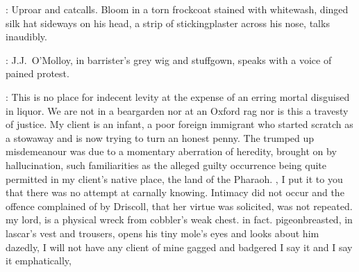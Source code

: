 :
Uproar and catcalls.
Bloom in a torn frockcoat stained with whitewash,
dinged silk hat sideways on his head,
a strip of stickingplaster across his nose,
talks inaudibly.

:
J.J.~O'Molloy,
in barrister's grey wig and stuffgown,
speaks with a voice of pained protest.

\JJOM:
This is no place for indecent levity at the
expense of an erring mortal disguised in liquor.
We are not in a beargarden nor at an Oxford rag
nor is this a travesty of justice.
My client is an infant,
a poor foreign immigrant
who started scratch as a stowaway and is now trying to turn an honest penny.
The trumped up misdemeanour was due to a momentary aberration of heredity,
brought on by hallucination,
such familiarities as the alleged guilty occurrence
being quite permitted in my client's native place,
the land of the Pharaoh.
,
I put it to you that there was no attempt at carnally knowing.
Intimacy did not occur and the offence complained of by Driscoll,
that her virtue was solicited,
was not repeated.
my lord,
is a physical wreck from cobbler's weak chest.
in fact.
%
pigeonbreasted,
in lascar's vest and trousers,
opens his tiny mole's eyes and looks about him dazedly,
%
%
I will not have any client of mine gagged and badgered
I say it and I say it emphatically,
